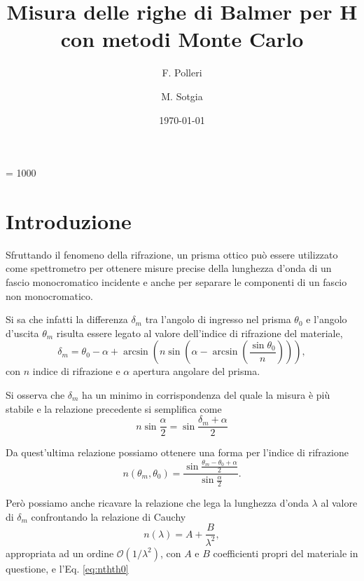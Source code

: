 \documentclass[a4paper,aps,12pt,tightenlines]{revtex4-2}
\begin{document}
\count\footins = 1000
\title{Misura delle righe di Balmer per H con metodi Monte Carlo}
\author{F. Polleri}
\author{M. Sotgia}
\date{\today}
\maketitle

\tableofcontents

\section{Introduzione}
Sfruttando il fenomeno della rifrazione, un prisma ottico può essere utilizzato come spettrometro per ottenere misure precise della lunghezza d'onda di un fascio monocromatico incidente e anche per separare le componenti di un fascio non monocromatico. 

Si sa che infatti la differenza $\delta_m$ tra l'angolo di ingresso nel prisma $\theta_0$ e l'angolo d'uscita $\theta_m$ risulta essere legato al valore dell'indice di rifrazione del materiale, \begin{equation}\delta_m = \theta_0 - \alpha+\arcsin\left(n\sin\left(\alpha - \arcsin\left(\frac{\sin\theta_0}{n}\right)\right)\right),\end{equation} con $n$ indice di rifrazione e $\alpha$ apertura angolare del prisma. 

Si osserva che $\delta_m$ ha un minimo in corrispondenza del quale la misura è più stabile e la relazione precedente si semplifica come \begin{equation} n\sin\frac{\alpha}{2} = \sin\frac{\delta_m + \alpha}{2} \end{equation}

Da quest'ultima relazione possiamo ottenere una forma per l'indice di rifrazione \begin{equation} n(\theta_m, \theta_0) = \frac{\sin\frac{\theta_m-\theta_0 + \alpha}{2}}{\sin\frac{\alpha}{2}}.\label{eq:nthth0}\end{equation}

Però possiamo anche ricavare la relazione che lega la lunghezza d'onda $\lambda$ al valore di $\delta_m$ confrontando la relazione di Cauchy \begin{equation} n(\lambda) = A + \frac{B}{\lambda^2},\end{equation} appropriata ad un ordine $\mathcal O (1/\lambda^2)$, con $A$ e $B$ coefficienti propri del materiale in questione, e l'Eq. \eqref{eq:nthth0}
\end{document}
